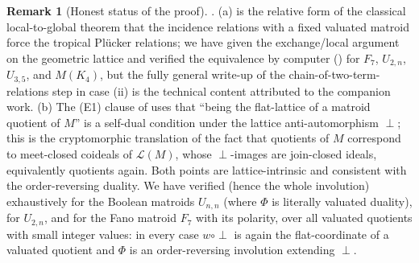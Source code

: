 \documentclass{article}
\theoremstyle{definition}
\newtheorem{remark}[theorem]{Remark}
\newcommand{\cLL}{\mathcal{L}}
\begin{document}
\begin{remark}[Honest status of the proof]
. (a)  is the relative form of the classical local-to-global
theorem that the incidence relations with a fixed valuated matroid force the tropical Pl\"ucker
relations; we have given the exchange/local argument on the geometric lattice and verified the
equivalence by computer () for $F_7$, $U_{2,n}$, $U_{3,5}$, and $M(K_4)$, but the
fully general write-up of the chain-of-two-term-relations step in case (ii) is the technical content
attributed to the companion work. (b) The (E1) clause of  uses that ``being the
flat-lattice of a matroid quotient of $M$'' is a self-dual condition under the lattice
anti-automorphism $\perp$; this is the cryptomorphic translation of the fact that quotients of $M$
correspond to meet-closed coideals of $\cLL(M)$, whose $\perp$-images are join-closed ideals,
equivalently quotients again. Both points are lattice-intrinsic and consistent with the order-reversing
duality. We have verified  (hence the whole involution) exhaustively for the Boolean
matroids $U_{n,n}$ (where $\Phi$ is literally valuated duality), for $U_{2,n}$, and for the Fano
matroid $F_7$ with its polarity, over all valuated quotients with small integer values: in every case
$w\circ\perp$ is again the flat-coordinate of a valuated quotient and $\Phi$ is an order-reversing
involution extending $\perp$.
\end{remark}
\end{document}
